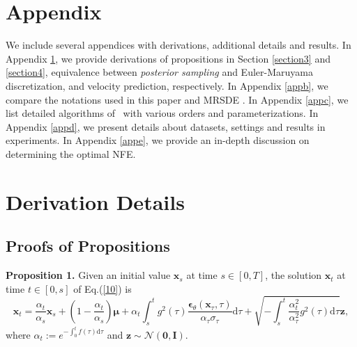\section*{Appendix}
\appendix

We include several appendices with derivations, additional details and results. In Appendix \ref{appa}, we provide derivations of propositions in Section \ref{section3} and \ref{section4}, equivalence between \textit{posterior sampling} and Euler-Maruyama discretization, and velocity prediction, respectively. In Appendix \ref{appb}, we compare the notations used in this paper and MRSDE \citep{luo2023mrsde}. In Appendix \ref{appc}, we list detailed algorithms of \ourmethod~with various orders and parameterizations. In Appendix \ref{appd}, we present details about datasets, settings and results in experiments. In Appendix \ref{appe}, we provide an in-depth discussion on determining the optimal NFE.

\section{Derivation Details}\label{appa}

\subsection{Proofs of Propositions}\label{appa1}

\textbf{Proposition 1.} Given an initial value $\boldsymbol{x}_s$ at time $s\in[0,T]$, the solution $\boldsymbol{x}_t$ at time $t\in[0,s]$ of Eq.(\ref{10}) is
\begin{equation}
    \boldsymbol{x}_t=\frac{\alpha_t}{\alpha_s}\boldsymbol{x}_s+(1-\frac{\alpha_t}{\alpha_s})\boldsymbol{\mu}+\alpha_t\int_s^tg^2(\tau)\frac{\boldsymbol{\epsilon}_\theta(\boldsymbol{x}_\tau,\tau)}{\alpha_{\tau}\sigma_{\tau}}\mathrm{d}\tau
    +\sqrt{-\int_s^t\frac{\alpha_t^2}{\alpha_\tau^2}g^2(\tau)\mathrm{d}\tau}\boldsymbol{z},
    \label{prop1}
\end{equation}
where $\alpha_t:=e^{-\int_0^tf(\tau)\mathrm{d}\tau}$ and $\boldsymbol{z}\sim \mathcal{N}(\boldsymbol{0},\boldsymbol{I})$.

